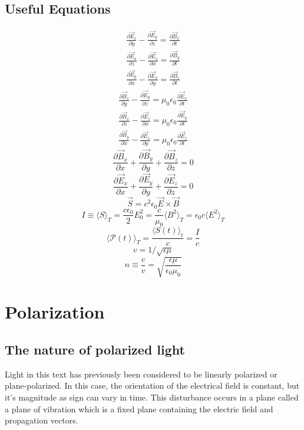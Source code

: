 \documentclass[12pt]{report}
\begin{document}
\section{Useful Equations}
\[\begin{array}{c}
\displaystyle \frac{\partial\vec{E}_z}{\partial y} - \frac{\partial\vec{E}_y}{\partial z} = \frac{\partial\vec{B}_x}{\partial t} \\
\displaystyle\frac{\partial\vec{E}_x}{\partial z} - \frac{\partial\vec{E}_z}{\partial x} = \frac{\partial\vec{B}_y}{\partial t} \\
\displaystyle\frac{\partial\vec{E}_y}{\partial x} - \frac{\partial\vec{E}_x}{\partial y} = \frac{\partial\vec{B}_z}{\partial t}
\end{array}\]
\[\begin{array}{c}
\displaystyle\frac{\partial\vec{B}_z}{\partial y} - \frac{\partial\vec{E}_y}{\partial z} = \mu_0\epsilon_0 \frac{\partial\vec{E}_x}{\partial t} \\
\displaystyle\frac{\partial\vec{B}_x}{\partial z} - \frac{\partial\vec{E}_z}{\partial x} = \mu_0\epsilon_0 \frac{\partial\vec{E}_y}{\partial t} \\
\displaystyle\frac{\partial\vec{B}_y}{\partial x} - \frac{\partial\vec{E}_x}{\partial y} = \mu_0\epsilon_0 \frac{\partial\vec{E}_z}{\partial t}
\end{array}\]
\[\frac{\partial\vec{B}_x}{\partial x}+\frac{\partial\vec{B}_y}{\partial y}+\frac{\partial\vec{B}_z}{\partial z} = 0\]
\[\frac{\partial\vec{E}_x}{\partial x}+\frac{\partial\vec{E}_y}{\partial y}+\frac{\partial\vec{E}_z}{\partial z} = 0\]
\[\vec{S} = c^2\epsilon_0 \vec{E}\times\vec{B}\]
\[I \equiv \langle S \rangle _T = \frac{c\epsilon_0}{2}E_0^2 = \frac{c}{\mu_0} \langle B^2 \rangle_T = \epsilon_0 c \langle E^2 \rangle_T\]
\[\langle \mathcal{P}(t) \rangle_T = \frac{\langle S(t) \rangle_t}{c} = \frac{I}{c}\]
\[v = 1/\sqrt{\epsilon\mu}\]
\[n \equiv \frac{c}{v} = \sqrt{\frac{\epsilon \mu}{\epsilon_0 \mu_0}}\]


\chapter{Polarization}
\section{The nature of polarized light}
Light in this text has previously been considered to be linearly polarized or plane-polarized. In this case, the orientation of the electrical field is constant, but it's magnitude as sign can vary in time. This disturbance occurs in a plane called a plane of vibration which is a fixed plane containing the electric field and propagation vectors. 
\end{document}
